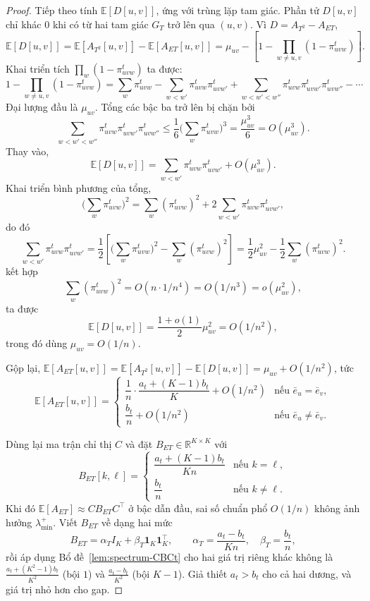 \begin{proof}
Tiếp theo tính $\mathbb{E}[D[u, v]]$, ứng với trùng lặp tam giác. Phần tử $D[u, v]$ chỉ khác $0$ khi có từ hai tam giác $G_T$ trở lên qua $(u, v)$. Vì $D = A_{T^2} - A_{ET}$,
\[
    \mathbb{E}[D[u, v]] = \mathbb{E}[A_{T^2}[u, v]] - \mathbb{E}[A_{ET}[u, v]] = \mu_{uv} - \left[1 - \prod_{w \neq u, v} (1 - \pi^t_{uvw})\right].
\]
Khai triển tích $\prod_w (1 - \pi^t_{uvw})$ ta được:
\[
    1 - \prod_{w \neq u, v} (1 - \pi^t_{uvw}) = \sum_w \pi^t_{uvw} - \sum_{w < w'} \pi^t_{uvw} \pi^t_{uvw'} + \sum_{w < w' < w''} \pi^t_{uvw} \pi^t_{uvw'} \pi^t_{uvw''} - \cdots
\]
Đại lượng đầu là $\mu_{uv}$. Tổng các bậc ba trở lên bị chặn bởi
\[
    \sum_{w < w' < w''} \pi^t_{uvw} \pi^t_{uvw'} \pi^t_{uvw''} \leq \frac{1}{6}\Big(\sum_w \pi^t_{uvw}\Big)^3 = \frac{\mu_{uv}^3}{6} = O(\mu_{uv}^3).
\]
Thay vào,
\[
    \mathbb{E}[D[u, v]] = \sum_{w < w'} \pi^t_{uvw} \pi^t_{uvw'} + O(\mu_{uv}^3).
\]
Khai triển bình phương của tổng,
\[
    \Big(\sum_w \pi^t_{uvw}\Big)^2 = \sum_w (\pi^t_{uvw})^2 + 2 \sum_{w < w'} \pi^t_{uvw} \pi^t_{uvw'},
\]
do đó
\[
    \sum_{w < w'} \pi^t_{uvw} \pi^t_{uvw'} = \frac{1}{2}\left[\Big(\sum_w \pi^t_{uvw}\Big)^2 - \sum_w (\pi^t_{uvw})^2\right] = \frac{1}{2} \mu_{uv}^2 - \frac{1}{2} \sum_w (\pi^t_{uvw})^2.
\]
kết hợp
\[
    \sum_w (\pi^t_{uvw})^2 = O(n \cdot 1/n^4) = O(1/n^3) = o(\mu_{uv}^2),
\]
ta được
\[
    \mathbb{E}[D[u, v]] = \frac{1 + o(1)}{2} \mu_{uv}^2 = O(1/n^2),
\]
trong đó dùng $\mu_{uv} = O(1/n)$.

Gộp lại, $\mathbb{E}[A_{ET}[u, v]] = \mathbb{E}[A_{T^2}[u, v]] - \mathbb{E}[D[u, v]] = \mu_{uv} + O(1/n^2)$, tức
\[
    \mathbb{E}[A_{ET}[u, v]] = \begin{cases}
        \dfrac{1}{n} \cdot \dfrac{a_t + (K-1) b_t}{K} + O(1/n^2) & \text{nếu } \bar e_u = \bar e_v, \\[8pt]
        \dfrac{b_t}{n} + O(1/n^2) & \text{nếu } \bar e_u \neq \bar e_v.
    \end{cases}
\]

Dùng lại ma trận chỉ thị $C$ và đặt $B_{ET} \in \mathbb{R}^{K \times K}$ với
\[
    B_{ET}[k, \ell] = \begin{cases}
        \dfrac{a_t + (K-1) b_t}{K n} & \text{nếu } k = \ell, \\[8pt]
        \dfrac{b_t}{n} & \text{nếu } k \neq \ell.
    \end{cases}
\]
Khi đó $\mathbb{E}[A_{ET}] \approx C B_{ET} C^\top$ ở bậc dẫn đầu, sai số chuẩn phổ $O(1/n)$ không ảnh hưởng $\lambda_{\min}^+$. Viết $B_{ET}$ về dạng hai mức
\[
    B_{ET} = \alpha_T I_K + \beta_T \mathbf{1}_K \mathbf{1}_K^\top, \qquad \alpha_T = \dfrac{a_t - b_t}{K n}, \quad \beta_T = \dfrac{b_t}{n},
\]
rồi áp dụng Bổ đề~\ref{lem:spectrum-CBCt} cho hai giá trị riêng khác không là $\tfrac{a_t + (K^2 - 1) b_t}{K^2}$ (bội $1$) và $\tfrac{a_t - b_t}{K^2}$ (bội $K-1$). Giả thiết $a_t > b_t$ cho cả hai dương, và giá trị nhỏ hơn cho gap.
\end{proof}

